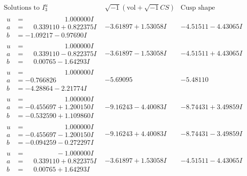 \documentclass[1p]{elsarticle_modified}
\theoremstyle{definition}
\newcommand{\I}{\sqrt{-1}}
\begin{document}
$$\begin{array}{c|c|c}  
\text{Solutions to }I^u_{3}& \I (\text{vol} + \sqrt{-1}CS) & \text{Cusp shape}\\
 \hline 
\begin{aligned}
u &= \phantom{-0.000000 -}1.000000 I \\
a &= \phantom{-}0.339110 + 0.822375 I \\
b &= -1.09217 - 0.97690 I\end{aligned}
 & -3.61897 + 1.53058 I & -4.51511 - 4.43065 I \\ \hline\begin{aligned}
u &= \phantom{-0.000000 -}1.000000 I \\
a &= \phantom{-}0.339110 - 0.822375 I \\
b &= \phantom{-}0.00765 - 1.64293 I\end{aligned}
 & -3.61897 - 1.53058 I & -4.51511 + 4.43065 I \\ \hline\begin{aligned}
u &= \phantom{-0.000000 -}1.000000 I \\
a &= -0.766826\phantom{ +0.000000I} \\
b &= -4.28864 - 2.21774 I\end{aligned}
 & -5.69095\phantom{ +0.000000I} & -5.48110\phantom{ +0.000000I} \\ \hline\begin{aligned}
u &= \phantom{-0.000000 -}1.000000 I \\
a &= -0.455697 + 1.200150 I \\
b &= -0.532590 + 1.109860 I\end{aligned}
 & -9.16243 - 4.40083 I & -8.74431 + 3.49859 I \\ \hline\begin{aligned}
u &= \phantom{-0.000000 -}1.000000 I \\
a &= -0.455697 - 1.200150 I \\
b &= -0.094259 - 0.272297 I\end{aligned}
 & -9.16243 + 4.40083 I & -8.74431 - 3.49859 I \\ \hline\begin{aligned}
u &= \phantom{-0.000000 } -1.000000 I \\
a &= \phantom{-}0.339110 + 0.822375 I \\
b &= \phantom{-}0.00765 + 1.64293 I\end{aligned}
 & -3.61897 + 1.53058 I & -4.51511 - 4.43065 I \\ \hline\begin{aligned}

\end{aligned}
\end{array}$$
\end{document}
